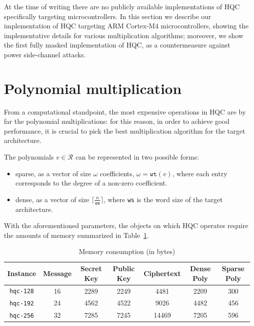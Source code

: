At the time of writing there are no publicly available implementations of HQC specifically targeting microcontrollers.
In this section we describe our implementation of HQC targeting ARM Cortex-M4 microcontrollers, showing the implementative
details for various multiplication algorithms; moreover, we show the first fully masked implementation of HQC, as a countermeasure
against power side-channel attacks.

\section{Polynomial multiplication}
From a computational standpoint, the most expensive operations in HQC are by far the polynomial multiplications: for this reason,
in order to achieve good performance, it is crucial to pick the best multiplication algorithm for the target architecture.

    The polynomials $v \in \mathcal{R}$ can be represented in two possible forms:
    \begin{itemize}
        \item sparse, as a vector of size $\omega$ coefficients, $\omega = \texttt{wt}(v)$, where each entry corresponds to the degree of a non-zero coefficient.
        \item dense, as a vector of size $\lceil \frac{n}{\texttt{ws}} \rceil$, where \texttt{ws} is the word size of the target architecture.
    \end{itemize}
    With the aforementioned parameters, the objects on which HQC operates require the amounts of memory summarized in Table~\ref{tab:memory}.
    \begin{table}[ht]\small
        \centering
        \caption{Memory consumption (in bytes)}
        \begin{tabular}{c c c c c|c c}
            \toprule
            Instance & Message & Secret Key & Public Key  & Ciphertext & Dense Poly & Sparse Poly \\
            \midrule
            \texttt{hqc-128} & 16 & 2289 & 2249 & 4481 & 2209 & 300\\
            \texttt{hqc-192} & 24 & 4562 & 4522 & 9026 & 4482 & 456\\
            \texttt{hqc-256} & 32 & 7285 & 7245 & 14469 & 7205 & 596\\
            \bottomrule
        \end{tabular}
        \label{tab:memory}
    \end{table}

